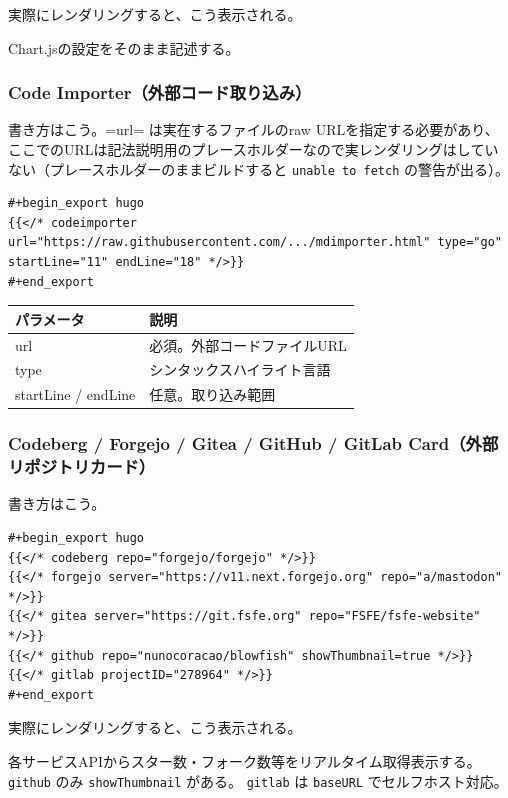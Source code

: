 \documentclass[11pt]{article}
\begin{document}
実際にレンダリングすると、こう表示される。

Chart.jsの設定をそのまま記述する。
\subsubsection{Code Importer（外部コード取り込み）}
\label{sec:orgd484a1b}

書き方はこう。=url= は実在するファイルのraw URLを指定する必要があり、ここでのURLは記法説明用のプレースホルダーなので実レンダリングはしていない（プレースホルダーのままビルドすると \texttt{unable to fetch} の警告が出る）。

\begin{verbatim}
#+begin_export hugo
{{</* codeimporter url="https://raw.githubusercontent.com/.../mdimporter.html" type="go" startLine="11" endLine="18" */>}}
#+end_export
\end{verbatim}

\begin{center}
\begin{tabular}{ll}
パラメータ & 説明\\
\hline
url & 必須。外部コードファイルURL\\
type & シンタックスハイライト言語\\
startLine / endLine & 任意。取り込み範囲\\
\end{tabular}
\end{center}
\subsubsection{Codeberg / Forgejo / Gitea / GitHub / GitLab Card（外部リポジトリカード）}
\label{sec:orgb02cc16}

書き方はこう。

\begin{verbatim}
#+begin_export hugo
{{</* codeberg repo="forgejo/forgejo" */>}}
{{</* forgejo server="https://v11.next.forgejo.org" repo="a/mastodon" */>}}
{{</* gitea server="https://git.fsfe.org" repo="FSFE/fsfe-website" */>}}
{{</* github repo="nunocoracao/blowfish" showThumbnail=true */>}}
{{</* gitlab projectID="278964" */>}}
#+end_export
\end{verbatim}

実際にレンダリングすると、こう表示される。

各サービスAPIからスター数・フォーク数等をリアルタイム取得表示する。 \texttt{github} のみ \texttt{showThumbnail} がある。 \texttt{gitlab} は \texttt{baseURL} でセルフホスト対応。
\end{document}
